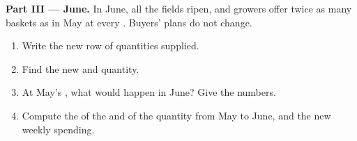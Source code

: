 \begin{problem}
\medskip
\noindent\textbf{Part III --- June.} In June, all the fields ripen, and growers offer twice as
many baskets as in May at every . Buyers' plans do not change.
\begin{enumerate}[resume]
  \item Write the new row of quantities supplied.
  \item Find the new  and quantity.
  \item At May's , what would happen in June? Give the numbers.
  \item Compute the  of the  and of the quantity from May to June, and the
        new weekly spending.
\end{enumerate}
\end{problem}
